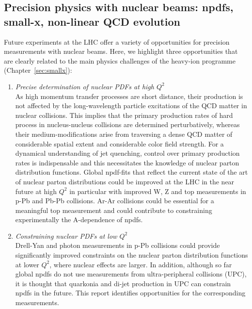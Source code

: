 \documentclass[../report.tex]{subfiles}
\begin{document}
\subsection{Precision physics with nuclear beams: npdfs, small-x, non-linear QCD evolution}
Future experiments at the LHC offer a variety of opportunities for precision measurements with nuclear beams. Here, we highlight three opportunities that are clearly related to the main physics challenges of the heavy-ion programme (Chapter~\ref{sec:smallx}):

\begin{enumerate}
\item {\it Precise determination of nuclear PDFs at high $Q^2$}\\ As high momentum transfer processes are short distance, their production is not affected by the long-wavelength particle excitations of the QCD matter in nuclear collisions. This implies that the primary production rates of hard process in nucleus-nucleus collisions are determined perturbatively, whereas their medium-modifications arise from traversing a dense QCD matter of considerable spatial extent and considerable color field strength. For  a dynamical understanding of jet quenching, control over primary production rates is indispensable and this necessitates the knowledge of nuclear parton distribution functions. Global npdf-fits that reflect the current state of the art of nuclear parton distributions could be improved at the LHC in the near future at high $Q^2$ in particular with improved W, Z and top measurements in p-Pb and Pb-Pb collisions. Ar-Ar collisions could be essential for a meaningful top measurement and could contribute to constraining experimentally the A-dependence of npdfs. 
\item {\it Constraining nuclear PDFs at low $Q^2$}\\ Drell-Yan and photon measurements in p-Pb collisions could provide significantly improved constraints on the nuclear parton distribution functions at lower $Q^2$, where nuclear effects are larger. In addition, although so far global npdfs do not use measurements from ultra-peripheral collisions (UPC), it is thought that quarkonia and di-jet production in UPC can constrain npdfs in the future. This report identifies opportunities for the corresponding measurements. 

\end{enumerate}
\end{document}
